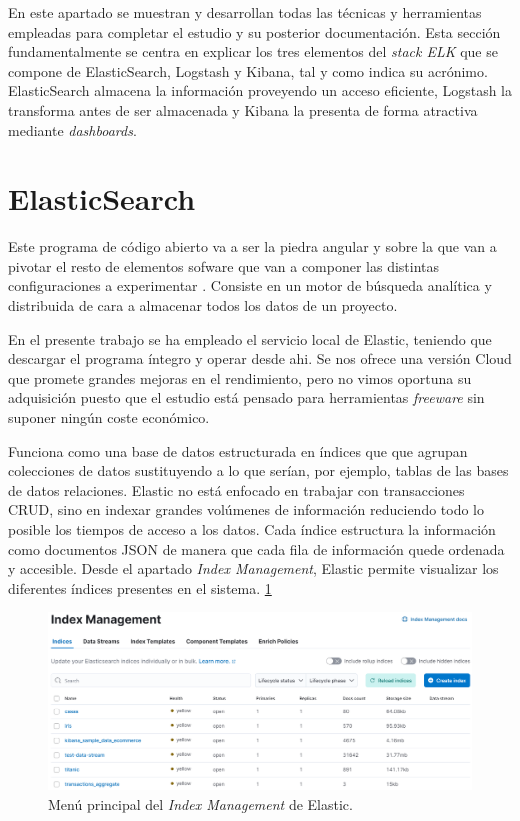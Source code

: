
En este apartado se muestran y desarrollan todas las técnicas y herramientas empleadas para completar el estudio y su posterior documentación. Esta sección fundamentalmente se centra en explicar los tres elementos del \textit{stack ELK} que se compone de ElasticSearch, Logstash y Kibana, tal y como indica su acrónimo. ElasticSearch almacena la información proveyendo un acceso eficiente, Logstash la transforma antes de ser almacenada y Kibana la presenta de forma atractiva mediante \textit{dashboards}. 

\section{ElasticSearch}
Este programa de código abierto va a ser la piedra angular y sobre la que van a pivotar el resto de elementos sofware que van a componer las distintas configuraciones a experimentar . Consiste en un motor de búsqueda analítica y distribuida de cara a almacenar todos los datos de un proyecto. \cite{ElasticSearch}

En el presente trabajo se ha empleado el servicio local de Elastic, teniendo que descargar el programa íntegro y operar desde ahi. Se nos ofrece una versión Cloud que promete grandes mejoras en el rendimiento, pero no vimos oportuna su adquisición puesto que el estudio está pensado para herramientas \textit{freeware} sin suponer ningún coste económico.

Funciona como una base de datos estructurada en índices que que agrupan colecciones de datos sustituyendo a lo que serían, por ejemplo, tablas de las bases de datos relaciones. Elastic no está enfocado en trabajar con transacciones CRUD, sino en indexar grandes volúmenes de información reduciendo todo lo posible los tiempos de acceso a los datos. Cada índice estructura la información como documentos JSON de manera que cada fila de información quede ordenada y accesible. Desde el apartado \textit{Index Management}, Elastic permite visualizar los diferentes índices presentes en el sistema. \ref{fig:indices}

\begin{figure}
    \centering
    \includegraphics[width=1\linewidth]{img/management.png}
    \caption{Menú principal del \textit{Index Management} de Elastic.}
    \label{fig:indices}
\end{figure}

